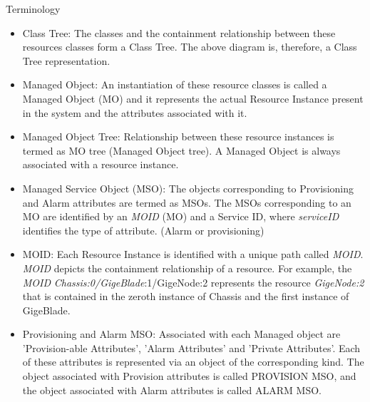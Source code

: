\begin{Desc}
\item[Terminology]\begin{itemize}
\item Class Tree: The classes and the containment relationship between these resources classes form a Class Tree. The above diagram is, therefore, a Class Tree representation.\end{itemize}
\begin{itemize}
\item Managed Object: An instantiation of these resource classes is called a Managed Object (MO) and it represents the actual Resource Instance present in the system and the attributes associated with it.\end{itemize}
\begin{itemize}
\item Managed Object Tree: Relationship between these resource instances is termed as MO tree (Managed Object tree). A Managed Object is always associated with a resource instance.\end{itemize}
\begin{itemize}
\item Managed Service Object (MSO): The objects corresponding to Provisioning and Alarm attributes are termed as MSOs. The MSOs corresponding to an MO are identified by an {\em MOID\/} (MO) and a Service ID, where {\em service\-ID\/} identifies the type of attribute. (Alarm or provisioning)\end{itemize}
\begin{itemize}
\item MOID: Each Resource Instance is identified with a unique path called {\em MOID\/}. {\em MOID\/} depicts the containment relationship of a resource. For example, the {\em MOID\/} {\em Chassis:0/Gige\-Blade\/}:1/Gige\-Node:2 represents the resource {\em Gige\-Node:2\/} that is contained in the zeroth instance of Chassis and the first instance of Gige\-Blade.\end{itemize}
\begin{itemize}
\item Provisioning and Alarm MSO: Associated with each Managed object are 'Provision-able Attributes', 'Alarm Attributes' and 'Private Attributes'. Each of these attributes is represented via an object of the corresponding kind. The object associated with Provision attributes is called PROVISION MSO, and the object associated with Alarm attributes is called ALARM MSO.\end{itemize}
\begin{itemize}

\end{itemize}
\end{Desc}
